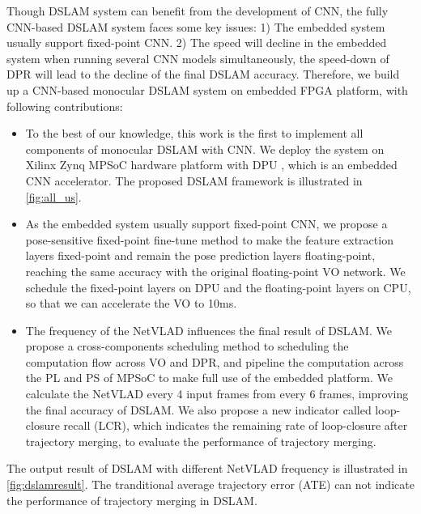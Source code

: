 Though DSLAM system can benefit from the development of CNN, the fully CNN-based DSLAM system faces some key issues: 1) The embedded system usually support fixed-point CNN. 2) The speed will decline in the embedded system when running several CNN models simultaneously, the speed-down of DPR will lead to the decline of the final DSLAM accuracy. Therefore, we build up a CNN-based monocular DSLAM system on embedded FPGA platform, with following contributions:

\begin{itemize}
\item To the best of our knowledge, this work is the first to implement all components of monocular DSLAM with CNN.
We deploy the system on Xilinx Zynq MPSoC hardware platform with DPU \cite{Tech:2019360}, which is an embedded CNN accelerator. The proposed DSLAM framework is illustrated in \cref{fig:all_us}.
\item As the embedded system usually support fixed-point CNN, we propose a pose-sensitive fixed-point fine-tune method to make the feature extraction layers fixed-point and remain the pose prediction layers floating-point, reaching the same accuracy with the original floating-point VO network. We schedule the fixed-point layers on DPU and the floating-point layers on CPU, so that we can accelerate the VO to 10ms.
\item The frequency of the NetVLAD influences the final result of DSLAM. We propose a cross-components scheduling method to scheduling the computation flow across VO and DPR, and pipeline the computation across the PL and PS of MPSoC to make full use of the embedded platform. We calculate the NetVLAD every 4 input frames from every 6 frames, improving the final accuracy of DSLAM. 
We also propose a new indicator called loop-closure recall (LCR), which indicates the remaining rate of loop-closure after trajectory merging, to evaluate the performance of trajectory merging.
\end{itemize}

The output result of DSLAM with different NetVLAD frequency is illustrated in \cref{fig:dslamresult}. The tranditional average trajectory error (ATE) can not indicate the performance of trajectory merging in DSLAM.

